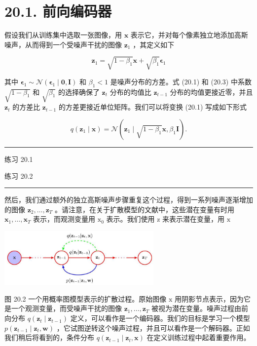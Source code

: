 \documentclass[10pt]{report}
\newcommand{\HRule}{\begin{center}\rule{0.9\linewidth}{0.2mm}\end{center}}
\begin{document}
\section*{20.1. 前向编码器}

假设我们从训练集中选取一张图像，用 \(\mathbf{x}\) 表示它，并对每个像素独立地添加高斯噪声，从而得到一个受噪声干扰的图像 \({\mathbf{z}}_{1}\) ，其定义如下

\[
{\mathbf{z}}_{1} = \sqrt{1 - {\beta }_{1}}\mathbf{x} + \sqrt{{\beta }_{1}}{\mathbf{\epsilon }}_{1} \tag{20.1}
\]

其中 \({\mathbf{\epsilon }}_{1} \sim  \mathcal{N}\left( {{\mathbf{\epsilon }}_{1} \mid  \mathbf{0},\mathbf{I}}\right)\) 和 \({\beta }_{1} < 1\) 是噪声分布的方差。式 (20.1) 和 (20.3) 中系数 \(\sqrt{1 - {\beta }_{1}}\) 和 \(\sqrt{{\beta }_{1}}\) 的选择确保了 \({\mathbf{z}}_{t}\) 分布的均值比 \({\mathbf{z}}_{t - 1}\) 分布的均值更接近零，并且 \({\mathbf{z}}_{t}\) 的方差比 \({\mathbf{z}}_{t - 1}\) 的方差更接近单位矩阵。我们可以将变换 (20.1) 写成如下形式

\[
q\left( {{\mathbf{z}}_{1} \mid  \mathbf{x}}\right)  = \mathcal{N}\left( {{\mathbf{z}}_{1} \mid  \sqrt{1 - {\beta }_{1}}\mathbf{x},{\beta }_{1}\mathbf{I}}\right) . \tag{20.2}
\]

\HRule

练习 20.1

练习 20.2

\HRule

然后，我们通过额外的独立高斯噪声步骤重复这个过程，得到一系列噪声逐渐增加的图像 \({\mathbf{z}}_{2},\ldots ,{\mathbf{z}}_{T}\) 。请注意，在关于扩散模型的文献中，这些潜在变量有时用 \({\mathbf{x}}_{1},\ldots ,{\mathbf{x}}_{T}\) 表示，而观测变量用 \({\mathrm{x}}_{0}\) 表示。我们使用 \(\mathrm{z}\) 来表示潜在变量，用 \(\mathrm{x}\)

\begin{center}
\includegraphics[max width=0.6\textwidth]{images/0194e279-9b28-703a-88f4-c3ac21e2010d_602_578_353_863_312_0.jpg}
\end{center}
\hspace*{3em} 

图 20.2 一个用概率图模型表示的扩散过程。原始图像 \(\mathrm{x}\) 用阴影节点表示，因为它是一个观测变量，而受噪声干扰的图像 \({\mathbf{z}}_{1},\ldots ,{\mathbf{z}}_{T}\) 被视为潜在变量。噪声过程由前向分布 \(q\left( {{\mathbf{z}}_{t} \mid  {\mathbf{z}}_{t - 1}}\right)\) 定义，可以看作是一个编码器。我们的目标是学习一个模型 \(p\left( {{\mathbf{z}}_{t - 1} \mid  {\mathbf{z}}_{t},\mathbf{w}}\right)\) ，它试图逆转这个噪声过程，并且可以看作是一个解码器。正如我们稍后将看到的，条件分布 \(q\left( {{\mathbf{z}}_{t - 1} \mid  {\mathbf{z}}_{t},\mathbf{x}}\right)\) 在定义训练过程中起着重要作用。
\end{document}
